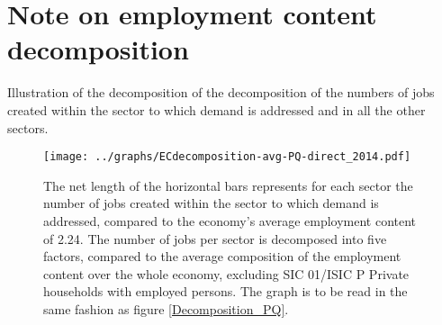 \documentclass[12pt,english]{article}
\newcommand\lies[2][]{\todo[color=orange!50,#1]{ldf: #2}}
\begin{document}
\clearpage
\section{Note on employment content decomposition}

Illustration of the decomposition of the decomposition of the numbers of jobs created within the sector to which demand is addressed and in all the other sectors.\lies{TODO}

\begin{figure}[!ht]
	\centering
	\texttt{[image: ../graphs/ECdecomposition-avg-PQ-direct\_2014.pdf]}
	\caption{\label{Decomposition_PQ_within}\footnotesize The net length of the horizontal bars represents for each sector the number of jobs created within the sector to which demand is addressed, compared to the economy's average employment content of 2.24. The number of jobs per sector is decomposed into five factors, compared to the average composition of the employment content over the whole economy, excluding SIC 01/ISIC P Private households with employed persons. The graph is to be read in the same fashion as figure \ref{Decomposition_PQ}. %
	}
\end{figure}	
\end{document}
